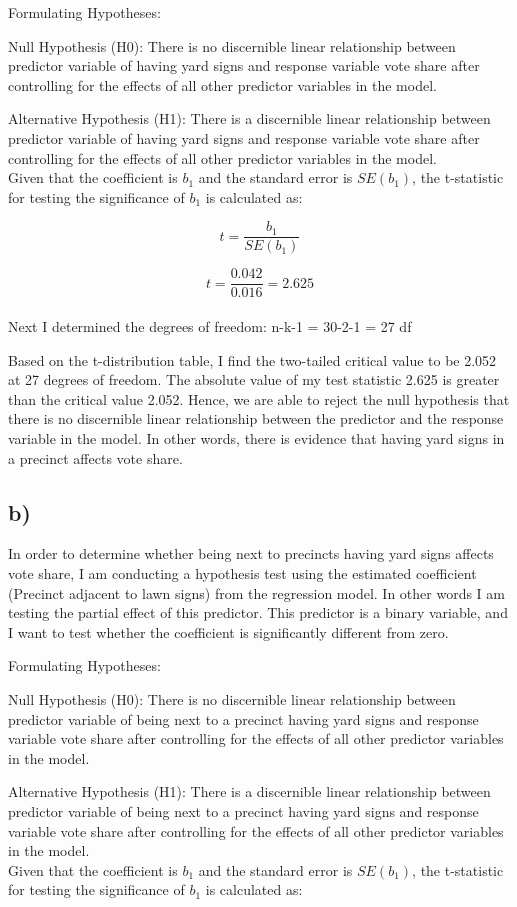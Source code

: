 \documentclass[oneside]{article}
\begin{document}
\noindent 
Formulating Hypotheses:

Null Hypothesis (H0): There is no discernible linear relationship between predictor variable of having yard signs and response variable vote share after controlling for the effects of all other predictor variables in the model. 

Alternative Hypothesis (H1): There is a discernible linear relationship between predictor variable of having yard signs and response variable vote share after controlling for the effects of all other predictor variables in the model. 
\\
Given that the coefficient is $b_1$ and the standard error is $SE(b_1)$, the t-statistic for testing the significance of $b_1$ is calculated as:

\[ t = \frac{b_1}{SE(b_1)} \]

\[ t = \frac{0.042}{0.016} = 2.625\]
\\
Next I determined the degrees of freedom: n-k-1 = 30-2-1 = 27 df

Based on the t-distribution table, I find the two-tailed critical value to be 2.052 at 27 degrees of freedom. The absolute value of my test statistic 2.625 is greater than the critical value 2.052. Hence, we are able to reject the null hypothesis that there is no discernible linear relationship between the predictor and the response variable in the model. In other words, there is evidence that having yard signs in a precinct affects vote share.

\subsection*{b)}

In order to determine whether being next to precincts having yard signs affects vote share, I am conducting a hypothesis test using the estimated coefficient (Precinct adjacent to lawn signs) from the regression model. In other words I am testing the partial effect of this predictor. 
This predictor is a binary variable, and I want to test whether the coefficient is significantly different from zero.

\noindent 
Formulating Hypotheses:

Null Hypothesis (H0): There is no discernible linear relationship between predictor variable of being next to a precinct having yard signs and response variable vote share after controlling for the effects of all other predictor variables in the model. 

Alternative Hypothesis (H1): There is a discernible linear relationship between predictor variable of being next to a precinct having yard signs and response variable vote share after controlling for the effects of all other predictor variables in the model. 
\\
Given that the coefficient is $b_1$ and the standard error is $SE(b_1)$, the t-statistic for testing the significance of $b_1$ is calculated as:
\end{document}
